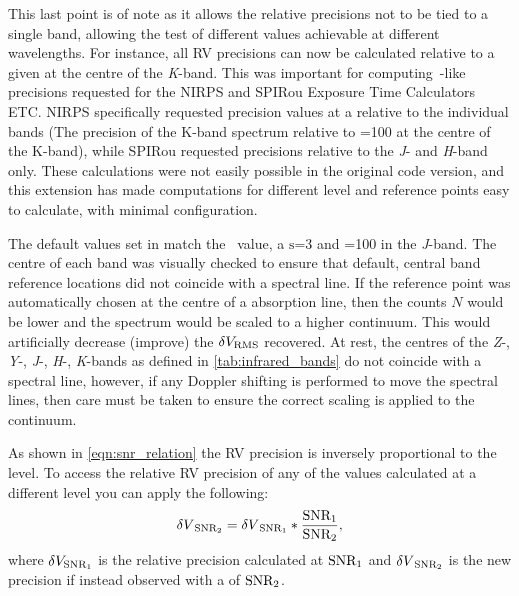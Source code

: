 This last point is of note as it allows the relative precisions not to be tied to a single band, allowing the test of different \snr{} values achievable at different wavelengths.
For instance, all {RV} precisions can now be calculated relative to a given \snr{} at the centre of the \textit{K}-band.
This was important for computing~\citet{figueira_radial_2016}-like precisions requested for the {NIRPS} and {SPIRou} Exposure Time Calculators {ETC}.
{NIRPS} specifically requested precision values at a \snr{} relative to the individual bands (The precision of the K-band spectrum relative to \snr{}=100 at the centre of the {K}-band), while {SPIRou} requested precisions relative to the \emph{J}- and \emph{H}-band only. 
These calculations were not easily possible in the original code version, and this extension has made computations for different \snr{} level and reference points easy to calculate, with minimal configuration.

The default values set in \eniric{} match the~\citet{figueira_radial_2016} value, a \(\mathrm{s}\)=3 and \snr{}=100 in the \emph{J}-band.
The centre of each band was visually checked to ensure that default, central band reference locations did not coincide with a spectral line. If the reference point was automatically chosen at the centre of a absorption line, then the counts \(N\) would be lower and the spectrum would be scaled to a higher continuum. This would artificially decrease (improve) the \(\delta V_{\textrm{RMS}}\) recovered.
At rest, the centres of the \emph{Z}-, \emph{Y}-, \emph{J}-, \emph{H}-, \emph{K}-bands as defined in \cref{tab:infrared_bands} do not coincide with a spectral line, however, if any Doppler shifting is performed to move the spectral lines, then care must be taken to ensure the correct scaling is applied to the continuum.

As shown in \cref{eqn:snr_relation} the {RV} precision is inversely proportional to the \snr{} level.
To access the relative {RV} precision of any of the values calculated at a different \snr{} level you can apply the following:
\begin{equation}
{\delta V}_{{\textrm{SNR}{}}_{2}} = {\delta V}_{{\textrm{SNR}{}}_{1}} * \frac{{\textrm{SNR}{}}_{1}}{{\textrm{SNR}{}}_{2}},
\end{equation}
where \(\delta {V}_{{\textrm{SNR}{}}_{1}}\) is the relative precision calculated at \({\textrm{SNR}{}}_{1}\) and \({\delta V}_{{\textrm{SNR}{}}_{2}}\) is the new precision if instead observed with a \snr{} of \({\textrm{SNR}{}}_{2}\).


